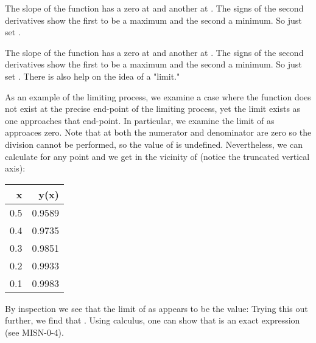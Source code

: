 {
{The slope of the function has a zero at  and another at .
 The signs of the second derivatives show the first to be a maximum and the second a minimum.
 So just set .
}

{The slope of the function has a zero at  and another at .
 The signs of the second derivatives show the first to be a maximum and the second a minimum.
 So just set .  There is also help on the idea of a "limit." 
}

{As an example of the limiting process, we examine a case where the function does not exist
at the precise end-point of the limiting process, yet the limit exists as one approaches that end-point.
In particular, we examine the limit of  as  approaces zero.
Note that at  both the numerator and denominator are zero so the division cannot be performed, so
the value of  is undefined.
Nevertheless, we can calculate  for any point  and we get in the vicinity of
 (notice the truncated vertical axis):
%
%
\begin{center}\begin{tabular}{|r|r|}\hline
x & y(x) \\ \hline
0.5 & 0.9589 \\
0.4 & 0.9735 \\
0.3 & 0.9851 \\
0.2 & 0.9933 \\
0.1 & 0.9983 \\ \hline
\end{tabular}\end{center}
By inspection we see that the limit of  as  appears to be the value:
%
%
Trying this out further, we find that .
Using calculus, one can show that  is an exact expression (see
 MISN-0-4).
}

}%
